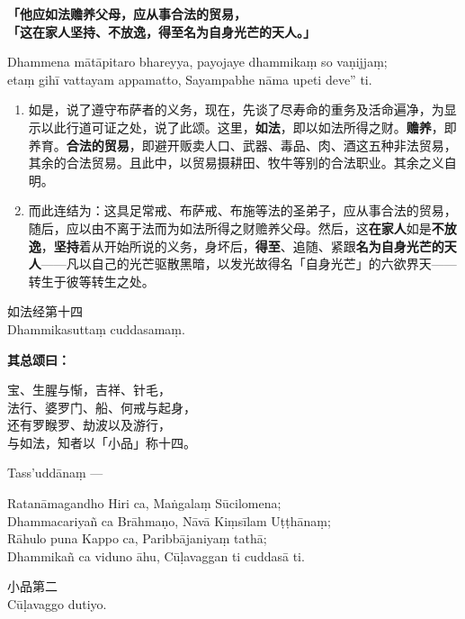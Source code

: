 \textbf{「他应如法赡养父母，应从事合法的贸易，\\}
\textbf{「这在家人坚持、不放逸，得至名为自身光芒的天人。」}

Dhammena mātāpitaro bhareyya, payojaye dhammikaṃ so vaṇijjaṃ;\\
etaṃ gihī vattayam appamatto, Sayampabhe nāma upeti deve” ti. %

\begin{enumerate}\item 如是，说了遵守布萨者的义务，现在，先谈了尽寿命的重务及活命遍净，为显示以此行道可证之处，说了此颂。这里，\textbf{如法}，即以如法所得之财。\textbf{赡养}，即养育。\textbf{合法的贸易}，即避开贩卖人口、武器、毒品、肉、酒这五种非法贸易，其余的合法贸易。且此中，以贸易摄耕田、牧牛等别的合法职业。其余之义自明。
\item 而此连结为：这具足常戒、布萨戒、布施等法的圣弟子，应从事合法的贸易，随后，应以由不离于法而为如法所得之财赡养父母。然后，这\textbf{在家人}如是\textbf{不放逸}，\textbf{坚持}着从开始所说的义务，身坏后，\textbf{得至}、追随、紧跟\textbf{名为自身光芒的天人}——凡以自己的光芒驱散黑暗，以发光故得名「自身光芒」的六欲界天——转生于彼等转生之处。\end{enumerate}

\begin{center}如法经第十四\\Dhammikasuttaṃ cuddasamaṃ.\end{center}

\textbf{其总颂曰：}

\begin{quoting}宝、生腥与惭，吉祥、针毛，\\法行、婆罗门、船、何戒与起身，\\还有罗睺罗、劫波以及游行，\\与如法，知者以「小品」称十四。\end{quoting}

Tass’uddānaṃ —

\begin{quoting}Ratanāmagandho Hiri ca, Maṅgalaṃ Sūcilomena;\\Dhammacariyañ ca Brāhmaṇo, Nāvā Kiṃsīlam Uṭṭhānaṃ;\\Rāhulo puna Kappo ca, Paribbājaniyaṃ tathā;\\Dhammikañ ca viduno āhu, Cūḷavaggan ti cuddasā ti.\end{quoting}

\begin{center}\vspace{1em}小品第二\\Cūḷavaggo dutiyo.\end{center}

